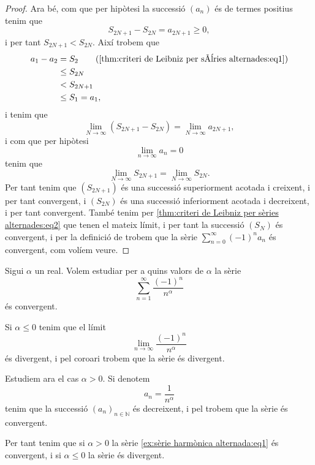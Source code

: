 \documentclass[../Apunts.tex]{subfiles}
\begin{document}
\begin{theorem}
\begin{proof}
			Ara bé, com que per hipòtesi la successió \((a_{n})\) és de termes positius tenim que
			\[S_{2N+1}-S_{2N}=a_{2N+1}\geq0,\]
			i per tant \(S_{2N+1}<S_{2N}\). Així trobem que
			\begin{align*}
				a_{1}-a_{2}&=S_{2} \tag{\ref{thm:criteri de Leibniz per sèries alternades:eq1}} \\
				&\leq S_{2N} \\
				&< S_{2N+1} \\
				&\leq S_{1}=a_{1},
			\end{align*}
			i tenim que
			\[\lim_{N\to\infty}\left(S_{2N+1}-S_{2N}\right)=\lim_{N\to\infty}a_{2N+1},\]
			i com que per hipòtesi
			\[\lim_{n\to\infty}a_{n}=0\]
			tenim que
			\begin{equation}
				\label{thm:criteri de Leibniz per sèries alternades:eq2}
				\lim_{N\to\infty}S_{2N+1}=\lim_{N\to\infty}S_{2N}.
			\end{equation}
			Per tant tenim que \((S_{2N+1})\) és una successió superiorment acotada i creixent, i per tant convergent, i \((S_{2N})\) és una successió inferiorment acotada i decreixent, i per tant convergent. També tenim per \eqref{thm:criteri de Leibniz per sèries alternades:eq2} que tenen el mateix límit, i per tant la successió \((S_{N})\) és convergent, i per la definició de  trobem que la sèrie \(\sum_{n=0}^{\infty}(-1)^{n}a_{n}\) és convergent, com volíem veure. %
		\end{proof}
	\end{theorem}
	\begin{example}
		\label{ex:sèrie harmònica alternada}
		Sigui \(\alpha\) un real. Volem estudiar per a quins valors de \(\alpha\) la sèrie
		\begin{equation}
			\label{ex:sèrie harmònica alternada:eq1}
			\sum_{n=1}^{\infty}\frac{(-1)^{n}}{n^{\alpha}}
		\end{equation}
		és convergent.
		\begin{solution}
			Si \(\alpha\leq0\) tenim que el límit
			\[\lim_{n\to\infty}\frac{(-1)^{n}}{n^{\alpha}}\]
			és divergent, i pel coro{\lgem}ari  trobem que la sèrie és divergent.
			
			Estudiem ara el cas \(\alpha>0\). Si denotem
			\[a_{n}=\frac{1}{n^{\alpha}}\]
			tenim que la successió \((a_{n})_{n\in\mathbb{N}}\) és decreixent, i pel  trobem que la sèrie és convergent.
			
			Per tant tenim que si \(\alpha>0\) la sèrie \eqref{ex:sèrie harmònica alternada:eq1} és convergent, i si \(\alpha\leq0\) la sèrie és divergent.
		\end{solution}
	\end{example}
\end{document}
